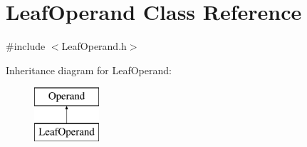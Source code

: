 \hypertarget{class_leaf_operand}{\section{Leaf\+Operand Class Reference}
\label{class_leaf_operand}
}


{\ttfamily \#include $<$Leaf\+Operand.\+h$>$}

Inheritance diagram for Leaf\+Operand\+:\begin{figure}[H]
\begin{center}
\leavevmode
\includegraphics[height=2.000000cm]{class_leaf_operand}
\end{center}
\end{figure}
